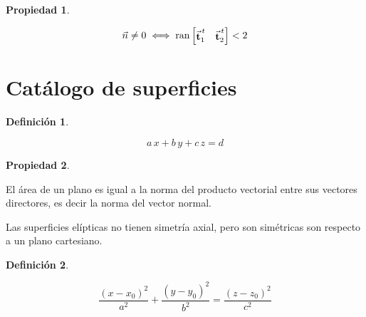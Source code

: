 \documentclass[a5paper,12pt,twoside]{book}
\newtheorem{defn}{{Definición}}[chapter]
\newtheorem{prop}{{Propiedad}}[chapter]
\begin{document}
\begin{mdframed}[style=PropertyFrame]
    \begin{prop}
    \end{prop}
    \begin{equation*}
        \Vec{n} \neq 0 \iff \operatorname{ran} \begin{bmatrix} \Vec{\textbf{t}}_1^{\,t} & \Vec{\textbf{t}}_2^{\,t} \end{bmatrix} <2
    \end{equation*}
\end{mdframed}


\section{Catálogo de superficies}

\begin{mdframed}[style=DefinitionFrame]
    \begin{defn}
    \end{defn}
    \begin{equation*}
        a\,x +b\,y +c\,z = d
    \end{equation*}
\end{mdframed}

\begin{mdframed}[style=PropertyFrame]
    \begin{prop}
    \end{prop}
    El área de un plano es igual a la norma del producto vectorial entre sus vectores directores, es decir la norma del vector normal.
\end{mdframed}


Las superficies elípticas no tienen simetría axial, pero son simétricas son respecto a un plano cartesiano.

\begin{mdframed}[style=DefinitionFrame]
    \begin{defn}
    \end{defn}
    \begin{equation*}
        \frac{(x-x_0)^2}{a^2} + \frac{(y-y_0)^2}{b^2} = \frac{(z-z_0)^2}{c^2}
    \end{equation*}
\end{mdframed}
\end{document}
